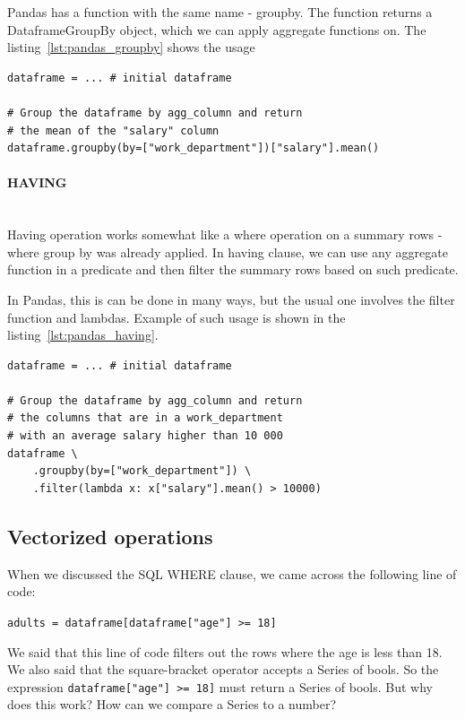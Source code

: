 Pandas has a function with the same name - groupby.
The function returns a DataframeGroupBy object, which we can apply aggregate functions on.
The listing~\ref{lst:pandas_groupby} shows the usage

\begin{lstlisting}[caption=Group by in Pandas, label={lst:pandas_groupby}, captionpos=b]
dataframe = ... # initial dataframe

# Group the dataframe by agg_column and return
# the mean of the "salary" column
dataframe.groupby(by=["work_department"])["salary"].mean()
\end{lstlisting}

\paragraph{HAVING} \leavevmode \\

Having operation works somewhat like a where operation on a summary rows - where group by was already applied.
In having clause, we can use any aggregate function in a predicate and then filter the summary rows based on such
predicate.

In Pandas, this is can be done in many ways, but the usual one involves the filter function and lambdas.
Example of such usage is shown in the listing~\ref{lst:pandas_having}.

\begin{lstlisting}[caption=Having in Pandas, label={lst:pandas_having}, captionpos=b]
dataframe = ... # initial dataframe

# Group the dataframe by agg_column and return
# the columns that are in a work_department
# with an average salary higher than 10 000
dataframe \
    .groupby(by=["work_department"]) \
    .filter(lambda x: x["salary"].mean() > 10000)
\end{lstlisting}


\subsection{Vectorized operations}

When we discussed the SQL WHERE clause, we came across the following line of code:

\verb|adults = dataframe[dataframe["age"] >= 18]|

We said that this line of code filters out the rows where the age is less than 18.
We also said that the square-bracket operator accepts a Series of bools.
So the expression \verb|dataframe["age"] >= 18]| must return a Series of bools.
But why does this work?
How can we compare a Series to a number?

